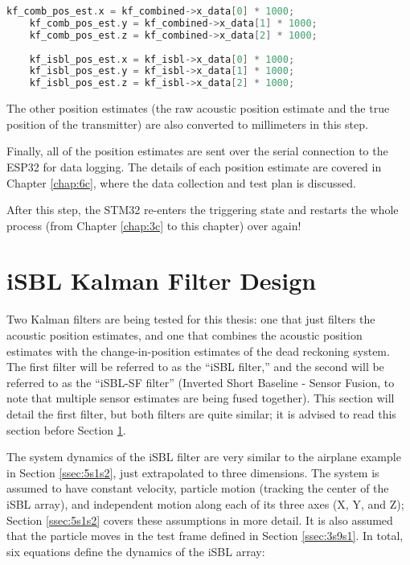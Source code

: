 \documentclass[12pt,a4paper]{report}
\begin{document}
\begin{lstlisting}[language=C++]
	kf_comb_pos_est.x = kf_combined->x_data[0] * 1000;
	kf_comb_pos_est.y = kf_combined->x_data[1] * 1000;
	kf_comb_pos_est.z = kf_combined->x_data[2] * 1000;
	
	kf_isbl_pos_est.x = kf_isbl->x_data[0] * 1000;
	kf_isbl_pos_est.y = kf_isbl->x_data[1] * 1000;
	kf_isbl_pos_est.z = kf_isbl->x_data[2] * 1000;
\end{lstlisting}

The other position estimates (the raw acoustic position estimate and the true position of the transmitter) are also converted to millimeters in this step.

Finally, all of the position estimates are sent over the serial connection to the ESP32 for data logging. The details of each position estimate are covered in Chapter \ref{chap:6c}, where the data collection and test plan is discussed.

After this step, the STM32 re-enters the triggering state and restarts the whole process (from Chapter \ref{chap:3c} to this chapter) over again!

\section{iSBL Kalman Filter Design} \label{sec:5s3}
Two Kalman filters are being tested for this thesis: one that just filters the acoustic position estimates, and one that combines the acoustic position estimates with the change-in-position estimates of the dead reckoning system. The first filter will be referred to as the “iSBL filter,” and the second will be referred to as the “iSBL-SF filter” (Inverted Short Baseline - Sensor Fusion, to note that multiple sensor estimates are being fused together). This section will detail the first filter, but both filters are quite similar; it is advised to read this section before Section \ref{sec:5s3}.

The system dynamics of the iSBL filter are very similar to the airplane example in Section \ref{ssec:5s1s2}, just extrapolated to three dimensions. The system is assumed to have constant velocity, particle motion (tracking the center of the iSBL array), and independent motion along each of its three axes (X, Y, and Z); Section \ref{ssec:5s1s2} covers these assumptions in more detail. It is also assumed that the particle moves in the test frame defined in Section \ref{ssec:3s9s1}. In total, six equations define the dynamics of the iSBL array:
\end{document}
